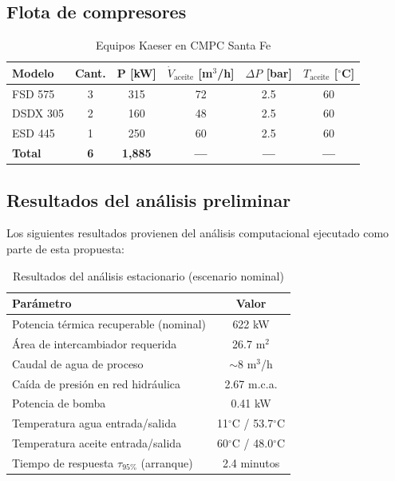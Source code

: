 \documentclass[11pt,a4paper]{article}
\begin{document}
\subsection{Flota de compresores}

\begin{table}[H]
\centering
\caption{Equipos Kaeser en CMPC Santa Fe}
\begin{tabular}{@{}lccccc@{}}
\toprule
\textbf{Modelo} & \textbf{Cant.} & \textbf{P [kW]} & \textbf{$\dot{V}_{\text{aceite}}$ [m$^3$/h]} & \textbf{$\Delta P$ [bar]} & \textbf{$T_{\text{aceite}}$ [$^\circ$C]} \\
\midrule
FSD 575 & 3 & 315 & 72 & 2.5 & 60 \\
DSDX 305 & 2 & 160 & 48 & 2.5 & 60 \\
ESD 445 & 1 & 250 & 60 & 2.5 & 60 \\
\midrule
\textbf{Total} & \textbf{6} & \textbf{1,885} & \textbf{---} & \textbf{---} & \textbf{---} \\
\bottomrule
\end{tabular}
\end{table}

\subsection{Resultados del análisis preliminar}

Los siguientes resultados provienen del análisis computacional ejecutado como parte de esta propuesta:

\begin{table}[H]
\centering
\caption{Resultados del análisis estacionario (escenario nominal)}
\begin{tabular}{@{}lc@{}}
\toprule
\textbf{Parámetro} & \textbf{Valor} \\
\midrule
Potencia térmica recuperable (nominal) & 622 kW \\
Área de intercambiador requerida & 26.7 m$^2$ \\
Caudal de agua de proceso & $\sim$8 m$^3$/h \\
Caída de presión en red hidráulica & 2.67 m.c.a. \\
Potencia de bomba & 0.41 kW \\
Temperatura agua entrada/salida & 11$^\circ$C / 53.7$^\circ$C \\
Temperatura aceite entrada/salida & 60$^\circ$C / 48.0$^\circ$C \\
Tiempo de respuesta $\tau_{95\%}$ (arranque) & 2.4 minutos \\
\bottomrule
\end{tabular}
\end{table}
\end{document}
